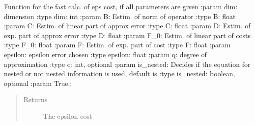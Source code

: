 \documentclass[letterpaper,10pt,english]{sphinxmanual}
\begin{document}
\begin{fulllineitems}
\label{\detokenize{index:Studienprojekt_Smolyak_qmc_one_point.fast_eps_cost}}
Function for the fast calc. of eps cost, if all parameters are given
:param dim: dimension
:type dim: int
:param B: Estim. of norm of operator
:type B: float
:param C: Estim. of linear part of approx error
:type C: float
:param D: Estim. of exp. part of approx error
:type D: float
:param F\_0: Estim. of linear part of costs
:type F\_0: float
:param F: Estim. of exp. part of cost
:type F: float
:param epsilon: epsilon error chosen
:type epsilon: float
:param q: degree of approximation
:type q: int, optional
:param is\_nested: Decides if the equation for nested or not nested information is used, default is
:type is\_nested: boolean, optional
:param True.:
\begin{quote}\begin{description}
\item[{Returns}] \leavevmode
The epsilon cost

\end{description}\end{quote}

\end{fulllineitems}

\end{document}

